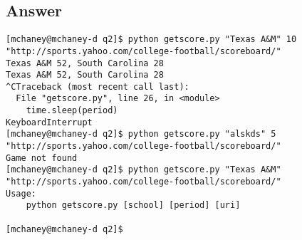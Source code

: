 \subsection{Answer}
\lstset{
	language=Bash,
}
\begin{lstlisting}
[mchaney@mchaney-d q2]$ python getscore.py "Texas A&M" 10 "http://sports.yahoo.com/college-football/scoreboard/"
Texas A&M 52, South Carolina 28
Texas A&M 52, South Carolina 28
^CTraceback (most recent call last):
  File "getscore.py", line 26, in <module>
    time.sleep(period)
KeyboardInterrupt
[mchaney@mchaney-d q2]$ python getscore.py "alskds" 5 "http://sports.yahoo.com/college-football/scoreboard/"
Game not found
[mchaney@mchaney-d q2]$ python getscore.py "Texas A&M" "http://sports.yahoo.com/college-football/scoreboard/"
Usage:
	python getscore.py [school] [period] [uri]

[mchaney@mchaney-d q2]$
\end{lstlisting}